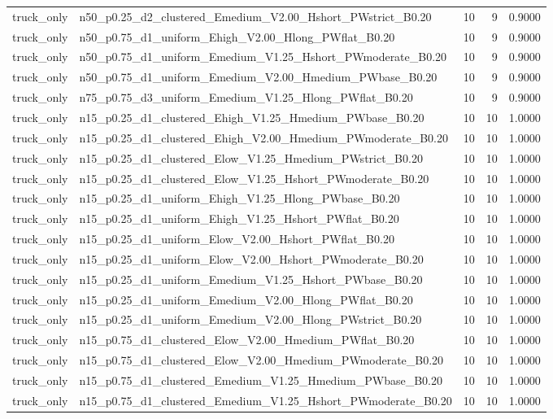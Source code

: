 \begin{tabular}{llrrr}
truck_only & n50_p0.25_d2_clustered_Emedium_V2.00_Hshort_PWstrict_B0.20 & 10 & 9 & 0.9000 \\
truck_only & n50_p0.75_d1_uniform_Ehigh_V2.00_Hlong_PWflat_B0.20 & 10 & 9 & 0.9000 \\
truck_only & n50_p0.75_d1_uniform_Emedium_V1.25_Hshort_PWmoderate_B0.20 & 10 & 9 & 0.9000 \\
truck_only & n50_p0.75_d1_uniform_Emedium_V2.00_Hmedium_PWbase_B0.20 & 10 & 9 & 0.9000 \\
truck_only & n75_p0.75_d3_uniform_Emedium_V1.25_Hlong_PWflat_B0.20 & 10 & 9 & 0.9000 \\
truck_only & n15_p0.25_d1_clustered_Ehigh_V1.25_Hmedium_PWbase_B0.20 & 10 & 10 & 1.0000 \\
truck_only & n15_p0.25_d1_clustered_Ehigh_V2.00_Hmedium_PWmoderate_B0.20 & 10 & 10 & 1.0000 \\
truck_only & n15_p0.25_d1_clustered_Elow_V1.25_Hmedium_PWstrict_B0.20 & 10 & 10 & 1.0000 \\
truck_only & n15_p0.25_d1_clustered_Elow_V1.25_Hshort_PWmoderate_B0.20 & 10 & 10 & 1.0000 \\
truck_only & n15_p0.25_d1_uniform_Ehigh_V1.25_Hlong_PWbase_B0.20 & 10 & 10 & 1.0000 \\
truck_only & n15_p0.25_d1_uniform_Ehigh_V1.25_Hshort_PWflat_B0.20 & 10 & 10 & 1.0000 \\
truck_only & n15_p0.25_d1_uniform_Elow_V2.00_Hshort_PWflat_B0.20 & 10 & 10 & 1.0000 \\
truck_only & n15_p0.25_d1_uniform_Elow_V2.00_Hshort_PWmoderate_B0.20 & 10 & 10 & 1.0000 \\
truck_only & n15_p0.25_d1_uniform_Emedium_V1.25_Hshort_PWbase_B0.20 & 10 & 10 & 1.0000 \\
truck_only & n15_p0.25_d1_uniform_Emedium_V2.00_Hlong_PWflat_B0.20 & 10 & 10 & 1.0000 \\
truck_only & n15_p0.25_d1_uniform_Emedium_V2.00_Hlong_PWstrict_B0.20 & 10 & 10 & 1.0000 \\
truck_only & n15_p0.75_d1_clustered_Elow_V2.00_Hmedium_PWflat_B0.20 & 10 & 10 & 1.0000 \\
truck_only & n15_p0.75_d1_clustered_Elow_V2.00_Hmedium_PWmoderate_B0.20 & 10 & 10 & 1.0000 \\
truck_only & n15_p0.75_d1_clustered_Emedium_V1.25_Hmedium_PWbase_B0.20 & 10 & 10 & 1.0000 \\
truck_only & n15_p0.75_d1_clustered_Emedium_V1.25_Hshort_PWmoderate_B0.20 & 10 & 10 & 1.0000 \\

\end{tabular}
